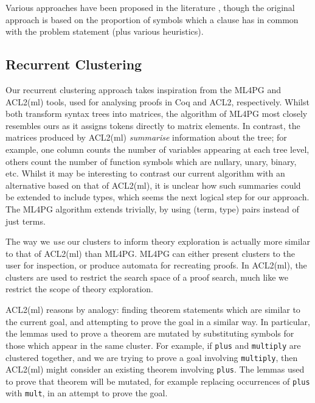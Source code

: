 Various approaches have been proposed in the literature \cite{kuhlwein2013mash} \cite{kuhlwein2012overview} \cite{alama2014premise}, though the original approach is based on the proportion of symbols which a clause has in common with the problem statement \cite{meng2009lightweight} (plus various heuristics).

\subsection{Recurrent Clustering}
\label{sec:clusteringexpressions}

Our recurrent clustering approach takes inspiration from the ML4PG \cite{journals/corr/abs-1212-3618} and ACL2(ml) \cite{heras2013proof} tools, used for analysing proofs in Coq and ACL2, respectively. Whilst both transform syntax trees into matrices, the algorithm of ML4PG most closely resembles ours as it assigns tokens directly to matrix elements. In contrast, the matrices produced by ACL2(ml) \emph{summarise} information about the tree; for example, one column counts the number of variables appearing at each tree level, others count the number of function symbols which are nullary, unary, binary, etc. Whilst it may be interesting to contrast our current algorithm with an alternative based on that of ACL2(ml), it is unclear how such summaries could be extended to include types, which seems the next logical step for our approach. The ML4PG algorithm extends trivially, by using (term, type) pairs instead of just terms.

The way we \emph{use} our clusters to inform theory exploration is actually more similar to that of ACL2(ml) than ML4PG. ML4PG can either present clusters to the user for inspection, or produce automata for recreating proofs. In ACL2(ml), the clusters are used to restrict the search space of a proof search, much like we restrict the scope of theory exploration.

ACL2(ml) reasons by analogy: finding theorem statements which are similar to the current goal, and attempting to prove the goal in a similar way. In particular, the lemmas used to prove a theorem are mutated by substituting symbols for those which appear in the same cluster. For example, if \texttt{plus} and \texttt{multiply} are clustered together, and we are trying to prove a goal involving \texttt{multiply}, then ACL2(ml) might consider an existing theorem involving \texttt{plus}. The lemmas used to prove that theorem will be mutated, for example replacing occurrences of \texttt{plus} with \texttt{mult}, in an attempt to prove the goal.

